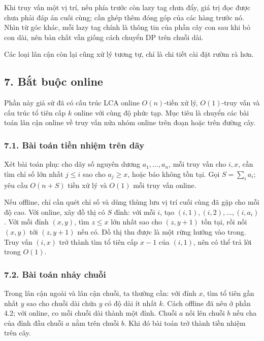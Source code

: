 \documentclass[11pt]{article}
\begin{document}
Khi truy vấn một vị trí, nếu phía trước còn lazy tag chưa đẩy, giá trị đọc được
chưa phải đáp án cuối cùng; cần ghép thêm đóng góp của các hàng trước nó. Nhìn
từ góc khác, mỗi lazy tag chính là thông tin của phần cây con sau khi bỏ con
dài, nên bản chất vẫn giống cách chuyển DP trên chuỗi dài.

Các loại lân cận còn lại cũng xử lý tương tự, chỉ là chi tiết cài đặt rườm rà
hơn.

\subsection*{7. Bắt buộc online}

Phần này giả sử đã có cấu trúc LCA online \(O(n)\)-tiền xử lý, \(O(1)\)-truy
vấn và cấu trúc tổ tiên cấp \(k\) online với cùng độ phức tạp. Mục tiêu là
chuyển các bài toán lân cận online về truy vấn nửa nhóm online trên đoạn hoặc
trên đường cây.

\subsubsection*{7.1. Bài toán tiền nhiệm trên dãy}

Xét bài toán phụ: cho dãy số nguyên dương \(a_1,\ldots,a_n\), mỗi truy vấn cho
\(i,x\), cần tìm chỉ số lớn nhất \(j\le i\) sao cho \(a_j\ge x\), hoặc báo
không tồn tại. Gọi \(S=\sum_i a_i\); yêu cầu \(O(n+S)\) tiền xử lý và
\(O(1)\) mỗi truy vấn online.

Nếu offline, chỉ cần quét chỉ số và dùng thùng lưu vị trí cuối cùng đã gặp cho
mỗi độ cao. Với online, xây đồ thị có \(S\) đỉnh: với mỗi \(i\), tạo
\((i,1),(i,2),\ldots,(i,a_i)\). Với mỗi đỉnh \((x,y)\), tìm \(z\le x\) lớn
nhất sao cho \((z,y+1)\) tồn tại, rồi nối \((x,y)\) tới \((z,y+1)\) nếu có.
Đồ thị thu được là một rừng hướng vào trong. Truy vấn \((i,x)\) trở thành tìm
tổ tiên cấp \(x-1\) của \((i,1)\), nên có thể trả lời trong \(O(1)\).

\subsubsection*{7.2. Bài toán nhảy chuỗi}

Trong lân cận ngoài và lân cận chuỗi, ta thường cần: với đỉnh \(x\), tìm tổ
tiên gần nhất \(y\) sao cho chuỗi dài chứa \(y\) có độ dài ít nhất \(k\). Cách
offline đã nêu ở phần 4.2; với online, co mỗi chuỗi dài thành một đỉnh. Chuỗi
\(a\) nối lên chuỗi \(b\) nếu cha của đỉnh đầu chuỗi \(a\) nằm trên chuỗi
\(b\). Khi đó bài toán trở thành tiền nhiệm trên cây.
\end{document}
